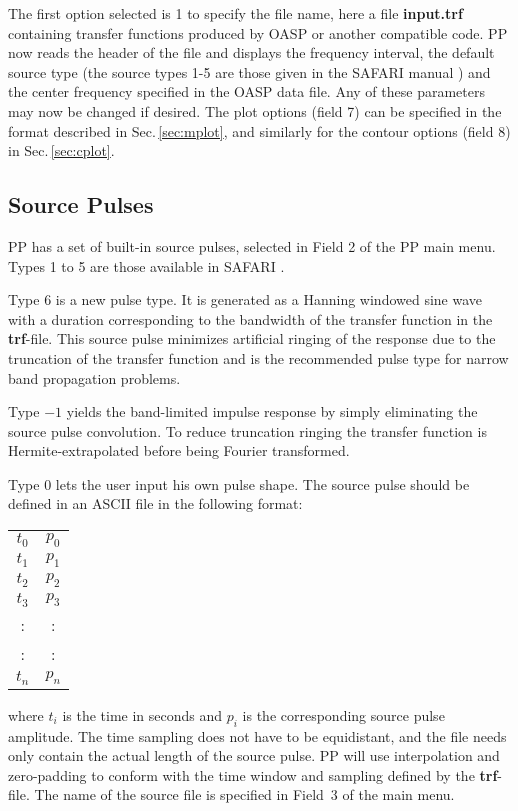     The first option selected is 1 to specify the file name, here a
file {\bf input.trf} containing transfer functions produced by OASP or
another compatible code. PP now reads the header of the file and
displays the frequency interval, the default source type (the source
types 1-5 are those given in the SAFARI manual \cite{hs:saf}) and the
center frequency specified in the OASP data file.  Any of these parameters may
now be changed if desired. The plot options (field 7) can be specified
in the format described in Sec.\,\ref{sec:mplot}, and similarly
for the contour options (field 8) in Sec.\,\ref{sec:cplot}.

\subsection{Source Pulses}

PP has a set of built-in source pulses, selected in Field 2 of the PP
main menu. Types 1 to 5 are those available in SAFARI \cite{hs:saf}.

Type 6 is a new pulse type. It is generated as a Hanning windowed sine
wave with a duration corresponding to the bandwidth of
the transfer function in the {\bf trf}-file. This source pulse
minimizes artificial ringing of the response due to the truncation of
the transfer function and is the recommended pulse type for narrow
band propagation problems.

Type $-1$ yields the band-limited impulse response by simply
eliminating the source pulse convolution. To reduce truncation ringing
the transfer function is Hermite-extrapolated before being Fourier
transformed.

Type 0 lets the user input his own pulse shape. The source pulse
should be defined in an ASCII file in the following format:


\begin{tabular}{cc}
$t_0$ & $p_0$ \\
$t_1$ & $p_1$ \\
$t_2$ & $p_2$ \\
$t_3$ & $p_3$ \\
  :   &   :   \\
  :   &   :   \\
$t_n$ & $p_n$ 
\end{tabular}

\noindent where $t_i$ is the time in seconds and $p_i$ is the
corresponding source pulse amplitude. The time sampling does not have
to be equidistant, and the file needs only contain the actual length
of the source pulse. PP will use interpolation and zero-padding to
conform with the time window and sampling defined by the {\bf
trf}-file. The name of the source file is specified in Field~3 of the
main menu. 

